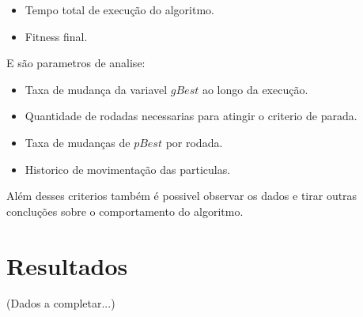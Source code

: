     \begin{itemize}
        \item Tempo total de execução do algoritmo.
        \item Fitness final.
    \end{itemize}
    


    E são parametros de analise:\newline
    
    \begin{itemize}
        \item Taxa de mudança da variavel $gBest$ ao longo da execução.
        \item Quantidade de rodadas necessarias para atingir o criterio de parada.
        \item Taxa de mudanças de $pBest$ por rodada.
        \item Historico de movimentação das particulas.
    \end{itemize}

    Além desses criterios também é possivel observar os dados e tirar outras concluções sobre o comportamento do algoritmo.\newline
    


\section{Resultados}
    (Dados a completar...)
